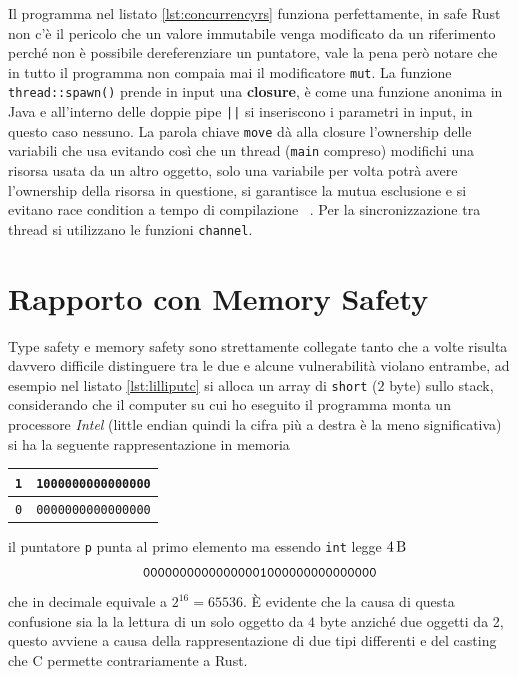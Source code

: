 \documentclass[Lau,binding=0.6cm]{sapthesis}
\begin{document}
Il programma nel listato \ref{lst:concurrencyrs} funziona perfettamente, in safe Rust non c'è il pericolo che un valore immutabile venga modificato da un riferimento perché non è possibile dereferenziare un puntatore, vale la pena però notare che in tutto il programma non compaia mai il modificatore \colorbox{backcolour}{\texttt{mut}}. La funzione \colorbox{backcolour}{\texttt{thread::spawn()}} prende in input una \textbf{closure}, è come una funzione anonima in Java e all'interno delle doppie pipe \colorbox{backcolour}{\texttt{||}} si inseriscono i parametri in input, in questo caso nessuno. La parola chiave \colorbox{backcolour}{\texttt{move}} dà alla closure l'ownership delle variabili che usa evitando così che un thread (\texttt{main} compreso) modifichi una risorsa usata da un altro oggetto, solo una variabile per volta potrà avere l'ownership della risorsa in questione, si garantisce la mutua esclusione e si evitano race condition a tempo di compilazione ~\cite[5.6]{rust:language_2}. Per la sincronizzazione tra thread si utilizzano le funzioni \colorbox{backcolour}{\texttt{channel}}. 




\section{Rapporto con Memory Safety}
Type safety e memory safety sono strettamente collegate tanto che a volte risulta davvero difficile distinguere tra le due e alcune vulnerabilità violano entrambe, ad esempio nel listato \ref{lst:lilliputc} si alloca un array di \texttt{short} ($2$ byte) sullo stack, considerando che il computer su cui ho eseguito il programma monta un processore \textit{Intel} (little endian quindi la cifra più a destra è la meno significativa) si ha la seguente rappresentazione in memoria

\begin{table}[H]
	\label{fig:mem_type_stack}
	\centering
	\begin{tabular}{|c|c|}
		\hline
		\texttt{1} & \texttt{1000000000000000} \\
		\hline 
		\texttt{0} & \texttt{0000000000000000} \\
		\hline
	\end{tabular}
\end{table}

il puntatore \texttt{p} punta al primo elemento ma essendo \texttt{int} legge $\SI{4}{\byte}$  
\[
\texttt{00000000000000001000000000000000} \\
\]
che in decimale equivale a $ 2^{16} = 65536 $. È evidente che la causa di questa confusione sia la la lettura di un solo oggetto da $4$ byte anziché due oggetti da 2, questo avviene a causa della rappresentazione di due tipi differenti e del casting che C permette contrariamente a Rust.
\end{document}
